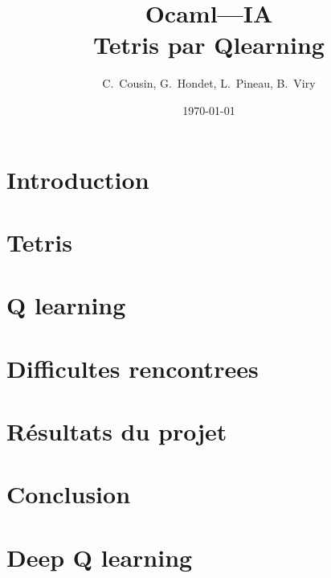 \documentclass{article}
\title{Ocaml---IA\\Tetris par Qlearning}
\author{C.~Cousin, G.~Hondet, L.~Pineau, B.~Viry}
\date{\today}
\begin{document}
\maketitle
\tableofcontents


\section*{Introduction}

\section{Tetris}

\section{Q learning}

\section{Difficultes rencontrees}

\section{R\'esultats du projet}

\section*{Conclusion}

\appendix
\section{Deep Q learning}
\end{document}
